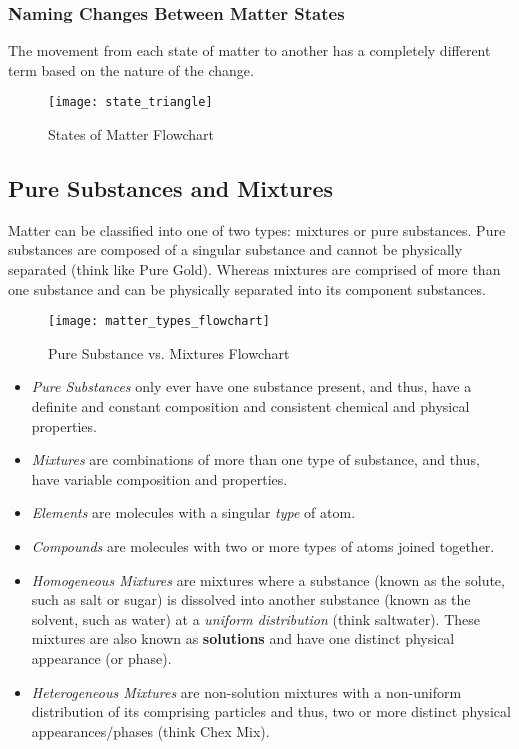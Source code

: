 \subsubsection{Naming Changes Between Matter States}

The movement from each state of matter to another has a completely different term based on the nature of the change.

\begin{figure}[H]
	\centering
	\texttt{[image: state\_triangle]}
	\caption{States of Matter Flowchart}
\end{figure}

\newpage

\subsection{Pure Substances and Mixtures}

Matter can be classified into one of two types: mixtures or pure substances. Pure substances are composed of a singular substance and cannot be physically separated (think like Pure Gold). Whereas mixtures are comprised of more than one substance and can be physically separated into its component substances.

\begin{figure}[H]
	\centering
	\texttt{[image: matter\_types\_flowchart]}
	\caption{Pure Substance vs. Mixtures Flowchart}
\end{figure}

\begin{itemize}
\item \textit{Pure Substances} only ever have one substance present, and thus, have a definite and constant composition and consistent chemical and physical properties. 
\item \textit{Mixtures} are combinations of more than one type of substance, and thus, have variable composition and properties. 
\item \textit{Elements} are molecules with a singular \textit{type} of atom.
\item \textit{Compounds} are molecules with two or more types of atoms joined together.
\item \textit{Homogeneous Mixtures} are mixtures where a substance (known as the solute, such as salt or sugar) is dissolved into another substance (known as the solvent, such as water) at a \textit{uniform distribution} (think saltwater). These mixtures are also known as \textbf{solutions} and have one distinct physical appearance (or phase).
\item \textit{Heterogeneous Mixtures} are non-solution mixtures with a non-uniform distribution of its comprising particles and thus, two or more distinct physical appearances/phases (think Chex Mix).
\end{itemize}

